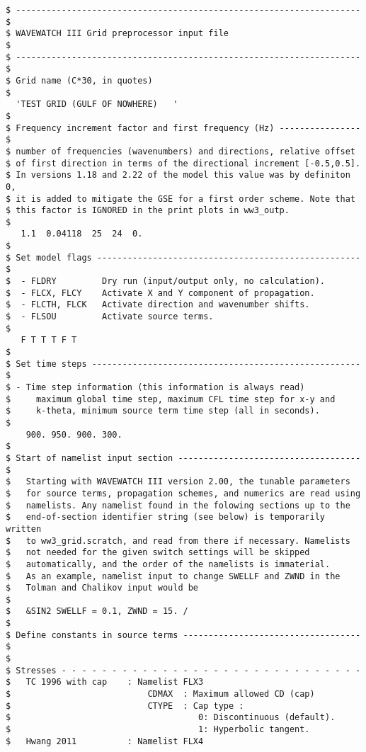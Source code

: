 \begin{footnotesize}
\begin{verbatim}
$ -------------------------------------------------------------------- $
$ WAVEWATCH III Grid preprocessor input file                           $
$ -------------------------------------------------------------------- $
$ Grid name (C*30, in quotes)
$
  'TEST GRID (GULF OF NOWHERE)   '
$
$ Frequency increment factor and first frequency (Hz) ---------------- $
$ number of frequencies (wavenumbers) and directions, relative offset
$ of first direction in terms of the directional increment [-0.5,0.5].
$ In versions 1.18 and 2.22 of the model this value was by definiton 0,
$ it is added to mitigate the GSE for a first order scheme. Note that
$ this factor is IGNORED in the print plots in ww3_outp.
$
   1.1  0.04118  25  24  0.
$
$ Set model flags ---------------------------------------------------- $
$  - FLDRY         Dry run (input/output only, no calculation).
$  - FLCX, FLCY    Activate X and Y component of propagation.
$  - FLCTH, FLCK   Activate direction and wavenumber shifts.
$  - FLSOU         Activate source terms.
$
   F T T T F T
$
$ Set time steps ----------------------------------------------------- $
$ - Time step information (this information is always read)
$     maximum global time step, maximum CFL time step for x-y and
$     k-theta, minimum source term time step (all in seconds).
$
    900. 950. 900. 300.
$
$ Start of namelist input section ------------------------------------ $
$   Starting with WAVEWATCH III version 2.00, the tunable parameters
$   for source terms, propagation schemes, and numerics are read using
$   namelists. Any namelist found in the folowing sections up to the
$   end-of-section identifier string (see below) is temporarily written
$   to ww3_grid.scratch, and read from there if necessary. Namelists
$   not needed for the given switch settings will be skipped
$   automatically, and the order of the namelists is immaterial.
$   As an example, namelist input to change SWELLF and ZWND in the
$   Tolman and Chalikov input would be
$
$   &SIN2 SWELLF = 0.1, ZWND = 15. /
$
$ Define constants in source terms ----------------------------------- $
$
$ Stresses - - - - - - - - - - - - - - - - - - - - - - - - - - - - - -
$   TC 1996 with cap    : Namelist FLX3
$                           CDMAX  : Maximum allowed CD (cap)
$                           CTYPE  : Cap type :
$                                     0: Discontinuous (default).
$                                     1: Hyperbolic tangent.
$   Hwang 2011          : Namelist FLX4

\end{verbatim}
\end{footnotesize}
